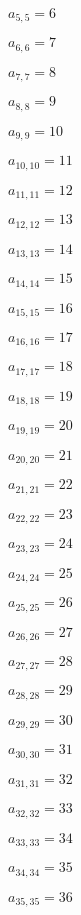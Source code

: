 \documentclass[a4paper,12pt]{article}
\begin{document}
$a _{ 5, 5 } = 6$

$a _{ 6, 6 } = 7$

$a _{ 7, 7 } = 8$

$a _{ 8, 8 } = 9$

$a _{ 9, 9 } = 10$

$a _{ 10, 10 } = 11$

$a _{ 11, 11 } = 12$

$a _{ 12, 12 } = 13$

$a _{ 13, 13 } = 14$

$a _{ 14, 14 } = 15$

$a _{ 15, 15 } = 16$

$a _{ 16, 16 } = 17$

$a _{ 17, 17 } = 18$

$a _{ 18, 18 } = 19$

$a _{ 19, 19 } = 20$

$a _{ 20, 20 } = 21$

$a _{ 21, 21 } = 22$

$a _{ 22, 22 } = 23$

$a _{ 23, 23 } = 24$

$a _{ 24, 24 } = 25$

$a _{ 25, 25 } = 26$

$a _{ 26, 26 } = 27$

$a _{ 27, 27 } = 28$

$a _{ 28, 28 } = 29$

$a _{ 29, 29 } = 30$

$a _{ 30, 30 } = 31$

$a _{ 31, 31 } = 32$

$a _{ 32, 32 } = 33$

$a _{ 33, 33 } = 34$

$a _{ 34, 34 } = 35$

$a _{ 35, 35 } = 36$
\end{document}
